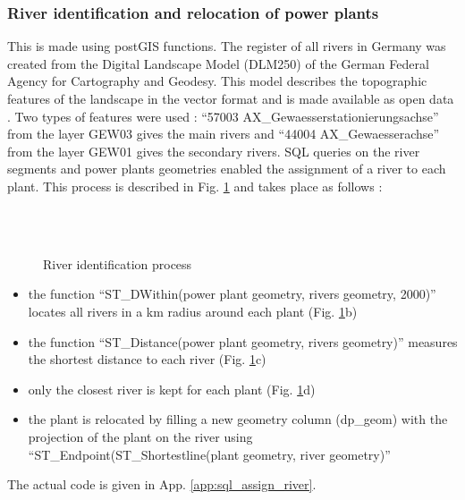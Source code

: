 \subsubsection*{River identification and relocation of power plants}

This is made using postGIS functions. The register of all rivers in Germany was created from the Digital Landscape Model (DLM250) of the German Federal Agency for Cartography and Geodesy. This model describes the topographic features of the landscape in the vector format and is made available as open data \cite{dlm250}. \newline Two types of features were used : ``57003 AX{\_}Gewaesserstationierungsachse'' from the layer GEW03 gives the main rivers and ``44004 AX{\_}Gewaesserachse'' from the layer GEW01 gives the secondary rivers. \newline 
SQL queries on the river segments and power plants geometries enabled the assignment of a river to each plant. This process is described in Fig. \ref{river_id} and takes place as follows : 

\begin{figure}[H]
\begin{center}
   \hspace{3cm}
   \\
   \hspace{3cm}
   \\ 
\end{center}
\caption{River identification process}
\label{river_id}
\end{figure}

\begin{itemize}
 \item the function ``ST{\_}DWithin(power plant geometry, rivers geometry, 2000)'' locates all rivers in a \unit[2]{km} radius around each plant (Fig. \ref{river_id}b)
 \item the function ``ST{\_}Distance(power plant geometry, rivers geometry)'' measures the  shortest distance to each river (Fig. \ref{river_id}c)
 \item only the closest river is kept for each plant (Fig. \ref{river_id}d)
 \item the plant is relocated by filling a new geometry column (dp{\_}geom) with the projection of the plant on the river using ``ST{\_}Endpoint(ST{\_}Shortestline(plant geometry, river geometry)''
\end{itemize}
The actual code is given in App. \ref{app:sql_assign_river}.

